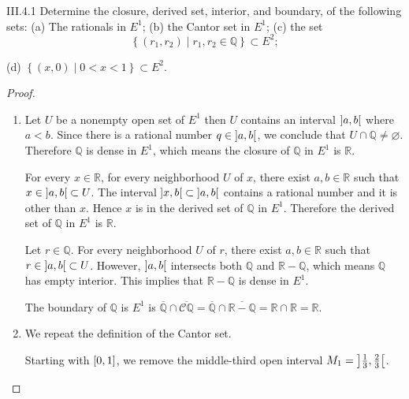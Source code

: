 \begin{problem}{III.4.1}
Determine the closure, derived set, interior, and boundary, of the following sets: (a) The rationals in \( E^{1} \); (b) the Cantor set in \(E^{1}\); (c) the set
\[
    \left\{ (r_{1}, r_{2}) \mid r_{1}, r_{2} \in \mathbb{Q} \right\} \subset E^{2};
\]

(d) \( \left\{ (x, 0) \mid 0 < x < 1 \right\} \subset E^{2} \).
\end{problem}

\begin{proof}
    \begin{enumerate}[label={(\alph*)},itemsep=0pt]
        \item Let \( U \) be a nonempty open set of \( E^{1} \) then \( U \) contains an interval \( \left]{a, b}\right[ \) where \( a < b \). Since there is a rational number \( q \in \left]{a, b}\right[ \), we conclude that \( U \cap \mathbb{Q} \ne \varnothing \). Therefore \( \mathbb{Q} \) is dense in \( E^{1} \), which means the closure of \( \mathbb{Q} \) in \( E^{1} \) is \( \mathbb{R} \).

              For every \( x \in \mathbb{R} \), for every neighborhood \( U \) of \( x \), there exist \( a, b \in \mathbb{R} \) such that \( x \in \left]{a, b}\right[ \subset U \). The interval \( \left]{x, b}\right[ \subset \left]{a, b}\right[ \) contains a rational number and it is other than \( x \). Hence \( x \) is in the derived set of \( \mathbb{Q} \) in \( E^{1} \). Therefore the derived set of \( \mathbb{Q} \) in \( E^{1} \) is \( \mathbb{R} \).

              Let \( r \in \mathbb{Q} \). For every neighborhood \( U \) of \( r \), there exist \( a, b \in \mathbb{R} \) such that \( r \in \left]{a, b}\right[ \subset U \). However, \( \left]{a, b}\right[ \) intersects both \( \mathbb{Q} \) and \( \mathbb{R} - \mathbb{Q} \), which means \( \mathbb{Q} \) has empty interior. This implies that \( \mathbb{R} - \mathbb{Q} \) is dense in \( E^{1} \).

              The boundary of \( \mathbb{Q} \) is \( E^{1} \) is \( \overline{\mathbb{Q}} \cap \overline{\mathscr{C}\mathbb{Q}} = \overline{\mathbb{Q}} \cap \overline{\mathbb{R} - \mathbb{Q}} = \mathbb{R} \cap \mathbb{R} = \mathbb{R} \).
        \item We repeat the definition of the Cantor set.

              Starting with \( \left[{0, 1}\right] \), we remove the middle-third open interval \( M_{1} = \left]{\frac{1}{3}, \frac{2}{3}}\right[ \).


\end{enumerate}
\end{proof}
